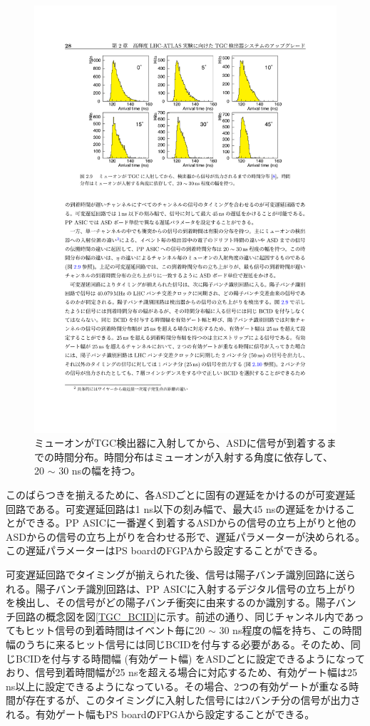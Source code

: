     \begin{figure} 
    \centering
    \includegraphics[width=16cm]{fig/Intro/TGC_fructuation.pdf}
    \caption[fructuation]{ミューオンがTGC検出器に入射してから、ASDに信号が到着するまでの時間分布\cite{TGC_fructuation}。時間分布はミューオンが入射する角度に依存して、20 $\sim$ 30 nsの幅を持つ。}
    \label{TGC_fructuation}
    \end{figure}

    このばらつきを揃えるために、各ASDごとに固有の遅延をかけるのが可変遅延回路である。可変遅延回路は1 ns以下の刻み幅で、最大45 nsの遅延をかけることができる。PP ASICに一番遅く到着するASDからの信号の立ち上がりと他のASDからの信号の立ち上がりを合わせる形で、遅延パラメーターが決められる。この遅延パラメーターはPS boardのFGPAから設定することができる。

    可変遅延回路でタイミングが揃えられた後、信号は陽子バンチ識別回路に送られる。陽子バンチ識別回路は、PP ASICに入射するデジタル信号の立ち上がりを検出し、その信号がどの陽子バンチ衝突に由来するのか識別する。陽子バンチ回路の概念図を図\ref{TGC_BCID}に示す。前述の通り、同じチャンネル内であってもヒット信号の到着時間はイベント毎に20 $\sim$ 30 ns程度の幅を持ち、この時間幅のうちに来るヒット信号には同じBCIDを付与する必要がある。そのため、同じBCIDを付与する時間幅 (有効ゲート幅) をASDごとに設定できるようになっており、信号到着時間幅が25 nsを超える場合に対応するため、有効ゲート幅は25 ns以上に設定できるようになっている。その場合、2つの有効ゲートが重なる時間が存在するが、このタイミングに入射した信号には2バンチ分の信号が出力される。有効ゲート幅もPS boardのFPGAから設定することができる。

